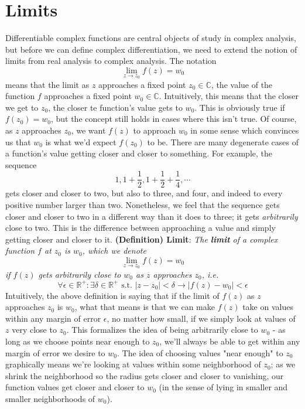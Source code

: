 \documentclass{article}
\newcommand*{\tb}{\textbf}
\newcommand*{\ti}{\textit}
\newcommand*{\nn}{\newline \newline}
\newcommand*{\R}{\mathbb{R}}
\newcommand*{\C}{\mathbb{C}}
\newcommand*{\st}{\text{ s.t. }}
\begin{document}
\section{Limits}
Differentiable complex functions are central objects of study in complex analysis, but before we can define complex differentiation, we need to extend the notion of limits from real analysis to complex analysis. The notation
$$ \lim_{z \to z_0} f(z) = w_0 $$
means that the limit as $ z $ approaches a fixed point $ z_0 \in \C $, the value of the function $ f $ approaches a fixed point $ w_0 \in \C $. Intuitively, this means that the closer we get to $ z_0 $, the closer te function's value gets to $ w_0 $. This is obviously true if $ f(z_0) = w_0 $, but the concept still holds in cases where this isn't true. Of course, as $ z $ approaches $ z_0 $, we want $ f(z) $ to approach $ w_0 $ in some sense which convinces us that $ w_0 $ is what we'd expect $ f(z_0) $ to be. There are many degenerate cases of a function's value getting closer and closer to something. For example, the sequence
$$ 1, 1 + \frac{1}{2}, 1 + \frac{1}{2} + \frac{1}{4}, \cdots $$
gets closer and closer to two, but also to three, and four, and indeed to every positive number larger than two. Nonetheless, we feel that the sequence gets closer and closer to two in a different way than it does to three; it gets \ti{arbitrarily} close to two. This is the difference between approaching a value and simply getting closer and closer to it.
\nn
\tb{(Definition) Limit}: \ti{The \tb{limit} of a complex function $ f $ at $ z_0 $ is $ w_0 $, which we denote}
$$ \lim_{z \to z_0} f(z) = w_0 $$
\indent \ti{if $ f(z) $ gets arbitrarily close to $ w_0 $ as $ z $ approaches $ z_0 $, i.e.}
$$ \forall \epsilon \in \R^+: \exists \delta \in \R^+ \st | z - z_0 | < \delta \rightarrow | f(z) - w_0 | < \epsilon $$
Intuitively, the above definition is saying that if the limit of $ f(z) $ as $ z $ approaches $ z_0 $ is $ w_0 $, what that means is that we can make $ f(z) $ take on values within any margin of error $ \epsilon $, no matter how small, if we simply look at values of $ z $ very close to $ z_0 $. This formalizes the idea of being arbitrarily close to $ w_0 $ - as long as we choose points near enough to $ z_0 $, we'll always be able to get within any margin of error we desire to $ w_0 $. The idea of choosing values "near enough" to $ z_0 $ graphically means we're looking at values within some neighborhood of $ z_0 $; as we shrink the neighborhood so the radius gets closer and closer to vanishing, our function values get closer and closer to $ w_0 $ (in the sense of lying in smaller and smaller neighborhoods of $ w_0 $).
\end{document}
